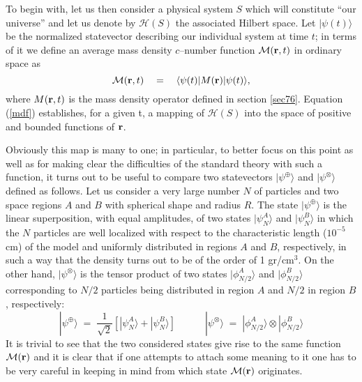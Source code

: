 \documentclass[12pt]{article}
\begin{document}
To begin with, let us then consider a physical system $S$ which
will constitute ``our universe'' and let us denote by ${\mathcal
H}(S)$ the associated Hilbert space. Let $|\psi(t)\rangle$ be the
normalized statevector describing our individual system at time
$t$; in terms of it we define an average mass density $c$--number
function ${\mathcal M}({\bf r},t)$ in ordinary space as
\begin{equation} \label{mdf}
{\mathcal M}({\bf r},t) \quad = \quad \langle \psi(t)| M({\bf
r})|\psi(t)\rangle,
\end{equation}
where $M({\bf r},t)$ is the mass density operator defined in
section \ref{sec76}. Equation
(\ref{mdf}) establishes, for a given t, a mapping of ${\mathcal
H}(S)$ into the space of positive and bounded functions of ${\bf
r}$.

Obviously this map is many to one; in particular, to better focus
on this point as well as for making clear the difficulties of the
standard theory with such a function, it turns out to be useful to
compare two statevectors $|\psi^{\oplus}\rangle$ and
$|\psi^{\otimes}\rangle$  defined as follows. Let us consider a
very large number $N$ of particles and two space regions $A$ and
$B$ with spherical shape and radius $R$. The state
$|\psi^{\oplus}\rangle$  is the linear superposition, with equal
amplitudes, of two states $|\psi^{A}_{N}\rangle$ and
$|\psi^{B}_{N}\rangle$  in which the $N$ particles are well
localized with respect to the characteristic length ($10^{-5}$ cm)
of the model and uniformly distributed in regions $A$ and $B$,
respectively, in such a way that the density turns out to be of
the order of 1 gr/cm$^{3}$. On the other hand,
$|\psi^{\otimes}\rangle$ is the tensor product of two states
$|\phi^{A}_{N/2}\rangle$ and  $|\phi^{B}_{N/2}\rangle$
corresponding to $N/2$ particles being distributed in region $A$
and $N/2$ in region $B$, respectively:
\begin{equation}
|\psi^{\oplus}\rangle \; = \; \frac{1}{\sqrt{2}}\left[
|\psi^{A}_{N}\rangle + |\psi^{B}_{N}\rangle \right] \qquad\quad
|\psi^{\otimes}\rangle \; = \; |\phi^{A}_{N/2}\rangle\otimes
|\phi^{B}_{N/2}\rangle
\end{equation}
It is trivial to see that the two considered states give rise to
the same function ${\mathcal M}({\bf r})$ and it is clear that if
one attempts to attach some meaning to it one has to be very
careful in keeping in mind from which state ${\mathcal M}({\bf
r})$ originates.
\end{document}
